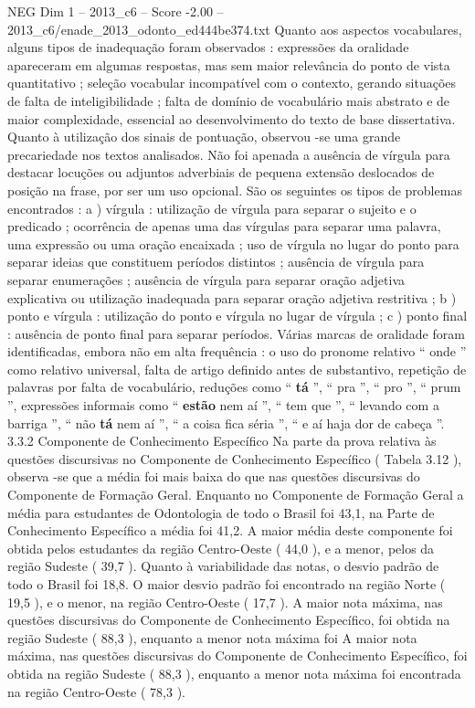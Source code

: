 \begin{textsample}{NEG Dim 1 – 2013\_c6 – Score -2.00 – 2013\_c6/enade\_2013\_odonto\_ed444be374.txt}
Quanto aos aspectos vocabulares, alguns tipos de inadequação foram observados : expressões da oralidade apareceram em algumas respostas, mas sem maior relevância do ponto de vista quantitativo ; seleção vocabular incompatível com o contexto, gerando situações de falta de inteligibilidade ; falta de domínio de vocabulário mais abstrato e de maior complexidade, essencial ao desenvolvimento do texto de base dissertativa.
Quanto à utilização dos sinais de pontuação, observou -se uma grande precariedade nos textos analisados.
Não foi apenada a ausência de vírgula para destacar locuções ou adjuntos adverbiais de pequena extensão deslocados de posição na frase, por ser um uso opcional.
São os seguintes os tipos de problemas encontrados : a ) vírgula : utilização de vírgula para separar o sujeito e o predicado ; ocorrência de apenas uma das vírgulas para separar uma palavra, uma expressão ou uma oração encaixada ; uso de vírgula no lugar do ponto para separar ideias que constituem períodos distintos ; ausência de vírgula para separar enumerações ; ausência de vírgula para separar oração adjetiva explicativa ou utilização inadequada para separar oração adjetiva restritiva ; b ) ponto e vírgula : utilização do ponto e vírgula no lugar de vírgula ; c ) ponto final : ausência de ponto final para separar períodos.
Várias marcas de oralidade foram identificadas, embora não em alta frequência : o uso do pronome relativo “ onde ” como relativo universal, falta de artigo definido antes de substantivo, repetição de palavras por falta de vocabulário, reduções como “ \textbf{tá} ”, “ pra ”, “ pro ”, “ prum ”, expressões informais como “ \textbf{estão} nem aí ”, “ tem que ”, “ levando com a barriga ”, “ não \textbf{tá} nem aí ”, “ a coisa fica séria ”, “ e aí haja dor de cabeça ”. 3.3.2 Componente de Conhecimento Específico Na parte da prova relativa às questões discursivas no Componente de Conhecimento Específico ( Tabela 3.12 ), observa -se que a média foi mais baixa do que nas questões discursivas do Componente de Formação Geral.
Enquanto no Componente de Formação Geral a média para estudantes de Odontologia de todo o Brasil foi 43,1, na Parte de Conhecimento Específico a média foi 41,2.
A maior média deste componente foi obtida pelos estudantes da região Centro-Oeste ( 44,0 ), e a menor, pelos da região Sudeste ( 39,7 ).
Quanto à variabilidade das notas, o desvio padrão de todo o Brasil foi 18,8.
O maior desvio padrão foi encontrado na região Norte ( 19,5 ), e o menor, na região Centro-Oeste ( 17,7 ).
A maior nota máxima, nas questões discursivas do Componente de Conhecimento Específico, foi obtida na região Sudeste ( 88,3 ), enquanto a menor nota máxima foi A maior nota máxima, nas questões discursivas do Componente de Conhecimento Específico, foi obtida na região Sudeste ( 88,3 ), enquanto a menor nota máxima foi encontrada na região Centro-Oeste ( 78,3 ).

\end{textsample}
